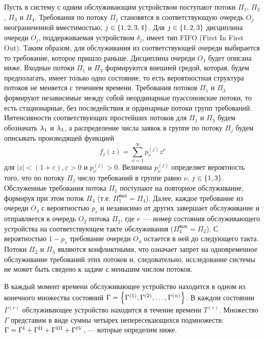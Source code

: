 \documentclass[a4paper,12pt,russian]{extarticle}
\newcommand{\G}{\Gamma}
\newcommand{\Gr}[1]{\Gamma^{(#1)}}
\newcommand{\ga}[1]{\Gamma^{\left( #1 \right)} }
\newcommand{\Tt}[1]{T^{\left( #1 \right)} }
\begin{document}
Пусть в систему с одним обслуживающим устройством поступают потоки $\Pi_1$, $\Pi_2$, $\Pi_3$  и $\Pi_4$. Требования по потоку $\Pi_j$ становятся в соответствующую очередь $O_j$ неограниченной вместимостью, $j\in \left\{1, 2, 3, 4\right\}$. Для $j \in \left\{1, 2, 3\right\}$ дисциплина очереди $O_j$, поддерживаемая устройством $\delta_j$, имеет тип FIFO (First In First Out). Таким образом, для обслуживания из соответствующей очереди выбирается то требование, которое пришло раньше. Дисциплина очереди $O_4$ будет описана ниже. Входные потоки $\Pi_1$ и $\Pi_3$ формируются внешней средой, которая, будем предполагать, имеет только одно состояние, то есть вероятностная структура потоков не меняется с течением времени. Требования потоков $\Pi_1$ и $\Pi_3$ формируют независимые между собой неординарные пуассоновские потоки, то есть  стационарные, без последействия и ординарные потоки групп требований. Интенсивности соответствующих простейших потоков для $\Pi_1$ и $\Pi_3$ будем обозначать $\lambda_1$ и $\lambda_3$, а распределение числа заявок в группе по потоку $\Pi_j$ будем описывать производящей функцией
\begin{equation}
f_j(z) = \sum_{\nu=1}^{\infty} p_{\nu}^{(j)} z ^{\nu}
\end{equation}
 для $|z|<(1+\varepsilon), \varepsilon > 0$ и $p_{\nu}^{(j)}>0$. Величина $p_{\nu}^{(j)}$ определяет вероятность того, что по потоку $\Pi_j$ число требований в группе равно $\nu$, $j\in \left\{1,3\right\}$. Обслуженные требования потока $\Pi_1$ поступают на повторное обслуживание, формируя при этом поток $\Pi_4$ (т.е. $\Pi_1^{\mathrm{\text{вых}}} =  \Pi_4$). Далее, каждое требование из очереди $O_4$ с вероятностью $p_r$ и независимо от других завершает обслуживание и отправляется в очередь $O_2$ потока $\Pi_2$, где $r$~---  номер состояния обслуживающего устройства на соответствующем такте обслуживания ($\Pi_4^{\mathrm{\text{вых}}}=\Pi_2$). С вероятностью $1-p_r$ требование очереди $O_4$ остается в ней до следующего такта. Потоки $\Pi_2$ и $\Pi_3$ являются конфликтными, что означает запрет на одновременное обслуживание требований этих потоков и, следовательно, исследование системы не может быть сведено к задаче с меньшим числом потоков. 
 
 В каждый момент времени обслуживающее устройство находится в одном из конечного множества состояний $\Gamma=\brrr{\Gr{1}, \Gr{2}, \ldots, \Gr{n}}$. В каждом состоянии $\ga{r}$ обслуживающее устройство находится в течение времени $\Tt{r}$. Множество $\G$ представим в виде суммы четырех непересекающихся подмножеств: $\G = \G^{\mathrm{\Rmnum{1}}} + \G^{\mathrm{\Rmnum{2}}} + \G^{\mathrm{\Rmnum{3}}} + \G^{\mathrm{\Rmnum{4}}}$, --- которые определим ниже.
\end{document}
